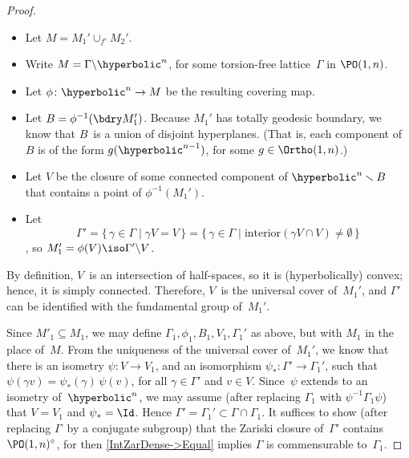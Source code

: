 \begin{proof}
 \ 
 \begin{itemize}
 \item Let $M = M_1' \cup_{f'} M_2'$.
 \item Write $M = \Gamma \backslash \hyperbolic^n$, for
some torsion-free lattice~$\Gamma$ in $\PO(1,n)$.
 \item Let $\phi \colon \hyperbolic^n \to M$ be the
resulting covering map.
 \item Let $B = \phi^{-1}(\bdry M_1')$. Because $M_1'$ has
totally geodesic boundary, we know that $B$~is a union of
disjoint hyperplanes. (That is, each component of~$B$ is of
the form $g(\hyperbolic^{n-1})$, for some $g \in
\Ortho(1,n)$.)
 \item Let $V$ be the closure of some connected component
of $\hyperbolic^n \smallsetminus B$ that contains a point
of $\phi^{-1}(M_1')$.
 \item Let 
 $$\Gamma'
 = \{\, \gamma \in \Gamma \mid \gamma V = V \,\}
 = \{\, \gamma \in \Gamma \mid \text{interior}(\gamma V \cap V) \neq \emptyset \,\} $$
 \csee{VTessellation}, so $M'_1 = \phi(V) \iso \Gamma'
\backslash V$.
 \end{itemize}

By definition, $V$~is an intersection of half-spaces, so it
is (hyperbolically) convex; hence, it is simply connected.
Therefore, $V$~is the universal cover of~$M_1'$, and
$\Gamma'$ can be identified with the fundamental group
of~$M_1'$.

Since $M'_1 \subseteq M_1$, we may define
$\Gamma_1,\phi_1,B_1,V_1,\Gamma_1'$ as above, but with
$M_1$ in the place of~$M$. From the uniqueness of the
universal cover of~$M_1'$, we know that there is an isometry
$\psi \colon V \to V_1$, and an isomorphism $\psi_* \colon
\Gamma' \to \Gamma_1'$, such that $\psi(\gamma v) =
\psi_*(\gamma) \, \psi(v)$, for all $\gamma \in \Gamma'$
and $v \in V$. Since~$\psi$ extends to an isometry
of~$\hyperbolic^n$, we may assume (after replacing
$\Gamma_1$ with $\psi^{-1} \Gamma_1 \psi$) that $V = V_1$
and $\psi_* = \Id$. Hence $\Gamma' = \Gamma_1' \subset
\Gamma \cap \Gamma_1$. It suffices to show (after replacing
$\Gamma$~by a conjugate subgroup) that the Zariski closure
of~$\Gamma'$ contains $\PO(1,n)^\circ$, for then
\cref{IntZarDense->Equal} implies $\Gamma$ is
commensurable to~$\Gamma_1$.


\end{proof}
